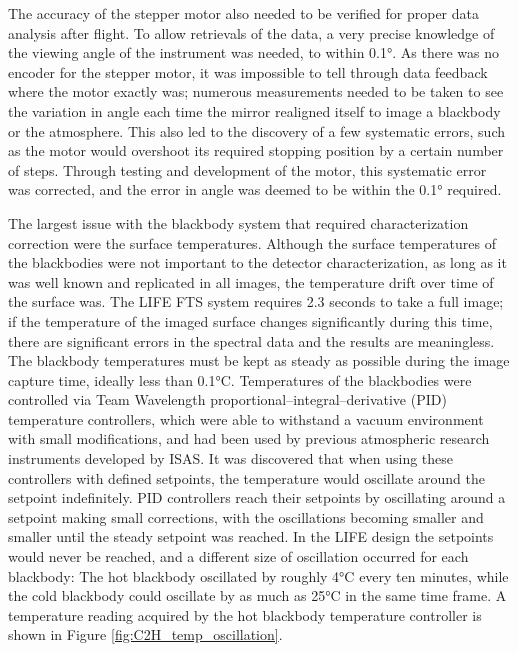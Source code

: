 The accuracy of the stepper motor also needed to be verified for proper data analysis after flight. To allow retrievals of the data, a very precise knowledge of the viewing angle of the instrument was needed, to within 0.1°. As there was no encoder for the stepper motor, it was impossible to tell through data feedback where the motor exactly was; numerous measurements needed to be taken to see the variation in angle each time the mirror realigned itself to image a blackbody or the atmosphere. This also led to the discovery of a few systematic errors, such as the motor would overshoot its required stopping position by a certain number of steps. Through testing and development of the motor, this systematic error was corrected, and the error in angle was deemed to be within the 0.1° required.

The largest issue with the blackbody system that required characterization correction were the surface temperatures. Although the surface temperatures of the blackbodies were not important to the detector characterization, as long as it was well known and replicated in all images, the temperature drift over time of the surface was. The LIFE FTS system requires 2.3 seconds to take a full image; if the temperature of the imaged surface changes significantly during this time, there are significant errors in the spectral data and the results are meaningless. The blackbody temperatures must be kept as steady as possible during the image capture time, ideally less than 0.1°C. Temperatures of the blackbodies were controlled via Team Wavelength proportional–integral–derivative (PID) temperature controllers, which were able to withstand a vacuum environment with small modifications, and had been used by previous atmospheric research instruments developed by ISAS. It was discovered that when using these controllers with defined setpoints, the temperature would oscillate around the setpoint indefinitely. PID controllers reach their setpoints by oscillating around a setpoint making small corrections, with the oscillations becoming smaller and smaller until the steady setpoint was reached. In the LIFE design the setpoints would never be reached, and a different size of oscillation occurred for each blackbody: The hot blackbody oscillated by roughly 4°C every ten minutes, while the cold blackbody could oscillate by as much as 25°C in the same time frame. A temperature reading acquired by the hot blackbody temperature controller is shown in Figure \ref{fig:C2H_temp_oscillation}.

